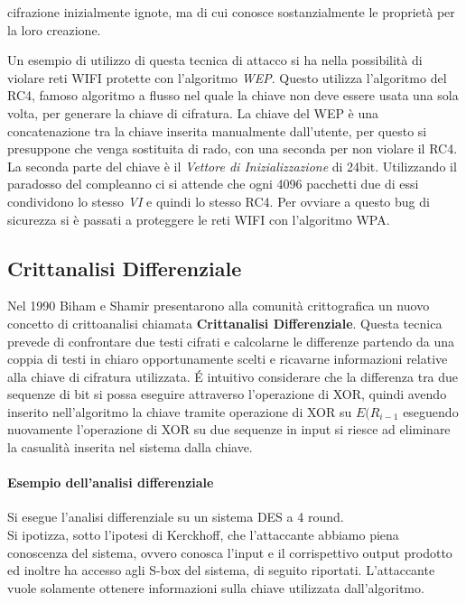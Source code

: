 \documentclass[11pt, a4paper, oneside]{Thesis} %
\begin{document}
\begin{itemize}
 cifrazione inizialmente ignote, ma di cui conosce sostanzialmente le proprietà per la loro creazione. 
 \par Un esempio di utilizzo di questa tecnica di attacco si ha nella possibilità di violare reti WIFI protette con l'algoritmo \textit{WEP}. 
 Questo utilizza l'algoritmo del RC4, famoso algoritmo a flusso nel quale la chiave non deve essere usata una sola volta, per generare la chiave di cifratura.
 La chiave del WEP è una concatenazione tra la chiave inserita manualmente dall'utente, per questo si presuppone che venga sostituita di rado, con una seconda per non
 violare il RC4. La seconda parte del chiave è il \textit{Vettore di Inizializzazione} di 24bit. Utilizzando il paradosso del compleanno ci si attende che ogni 4096 pacchetti 
 due di essi condividono lo stesso \textit{VI} e quindi lo stesso RC4. Per ovviare a questo bug di sicurezza si è passati a proteggere le reti WIFI con l'algoritmo WPA.
\end{itemize}
\subsection{Crittanalisi Differenziale}
Nel 1990 Biham e Shamir presentarono alla comunità crittografica un nuovo concetto di crittoanalisi chiamata \textbf{Crittanalisi Differenziale}.
Questa tecnica prevede di confrontare due testi cifrati e calcolarne le differenze partendo da una coppia di testi in chiaro opportunamente scelti e ricavarne informazioni relative
alla chiave di cifratura utilizzata. \'E intuitivo considerare che la differenza tra due sequenze di bit si possa eseguire attraverso l'operazione di XOR, quindi avendo inserito
nell'algoritmo la chiave tramite operazione di XOR su $E(R_{i-1}$ eseguendo nuovamente l'operazione di XOR su due sequenze in input si riesce ad eliminare la casualità inserita nel 
sistema dalla chiave.

\paragraph{Esempio dell'analisi differenziale} Si esegue l'analisi differenziale su un sistema DES a 4 round. 
\\ Si ipotizza, sotto l'ipotesi di Kerckhoff, che l'attaccante abbiamo piena conoscenza del sistema, ovvero conosca l'input e il corrispettivo output prodotto 
ed inoltre ha accesso agli S-box del sistema, di seguito riportati.
L'attaccante vuole solamente ottenere informazioni sulla chiave utilizzata dall'algoritmo.
\end{document}
